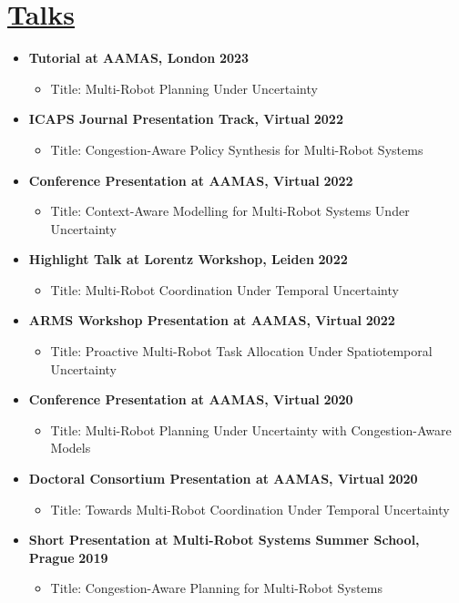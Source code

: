 \documentclass[11pt]{article}
\begin{document}
\section*{\underline{Talks}}
\begin{itemize}
\item \textbf{Tutorial at AAMAS, London} \hfill \textbf{2023}
\begin{itemize}
\item Title: Multi-Robot Planning Under Uncertainty
\end{itemize}
\item \textbf{ICAPS Journal Presentation Track, Virtual} \hfill \textbf{2022}
\begin{itemize}
\item Title: Congestion-Aware Policy Synthesis for Multi-Robot Systems
\end{itemize}
\item \textbf{Conference Presentation at AAMAS, Virtual} \hfill \textbf{2022}
\begin{itemize}
\item Title: Context-Aware Modelling for Multi-Robot Systems Under Uncertainty
\end{itemize}
\item \textbf{Highlight Talk at Lorentz Workshop, Leiden} \hfill \textbf{2022}
\begin{itemize}
\item Title: Multi-Robot Coordination Under Temporal Uncertainty
\end{itemize}
\item \textbf{ARMS Workshop Presentation at AAMAS, Virtual} \hfill \textbf{2022}
\begin{itemize}
\item Title: Proactive Multi-Robot Task Allocation Under Spatiotemporal Uncertainty
\end{itemize}
\item \textbf{Conference Presentation at AAMAS, Virtual} \hfill \textbf{2020}
\begin{itemize}
\item Title: Multi-Robot Planning Under Uncertainty with Congestion-Aware Models
\end{itemize}
\item \textbf{Doctoral Consortium Presentation at AAMAS, Virtual} \hfill \textbf{2020}
\begin{itemize}
\item Title: Towards Multi-Robot Coordination Under Temporal Uncertainty
\end{itemize}
\item \textbf{Short Presentation at Multi-Robot Systems Summer School, Prague} \hfill \textbf{2019}
\begin{itemize}
\item Title: Congestion-Aware Planning for Multi-Robot Systems
\end{itemize}
\end{itemize}
\end{document}
